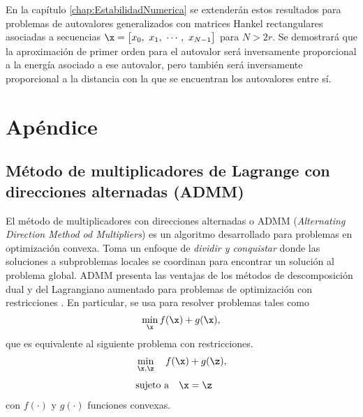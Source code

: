 		En la capítulo \ref{chap:EstabilidadNumerica} se extenderán estos resultados para problemas de autovalores generalizados con matrices Hankel rectangulares asociadas a secuencias $\x = \big[x_0,\ x_1,\ \cdots,\ x_{N-1} \big]$ para $N>2r$. Se demostrará que la aproximación de primer orden para el autovalor será inversamente proporcional a la energía asociado a ese autovalor, pero también será inversamente proporcional a la distancia con la que se encuentran los autovalores entre sí.

	
	
	
	
	
		
	\newpage
	\section{Apéndice}
	
	\subsection{Método de multiplicadores de Lagrange con direcciones alternadas (ADMM)}
	
	El método de multiplicadores con direcciones alternadas o ADMM (\emph{Alternating Direction Method od Multipliers}) \cite{Boyd2011} es un algoritmo desarrollado para problemas en optimización convexa. Toma un enfoque de \emph{dividir y conquistar} donde las soluciones a subproblemas locales se coordinan para encontrar un solución al problema global. ADMM presenta las ventajas de los métodos de descomposición dual y del Lagrangiano aumentado para problemas de optimización con restricciones \cite{Parikh2014}. En particular, se usa para resolver problemas tales como
	\begin{equation}
		\min_{\x} f(\x) + g(\x),
		\label{Eq:ADMM_apx1}
	\end{equation}
	que es equivalente al siguiente problema con restricciones.
	\begin{equation}
		\begin{aligned} 
			& \min_{\x,\z}\quad f(\x) + g(\z), \\[0.3em]
			& \text{sujeto a}\quad \x = \z
		\end{aligned}
		\label{eq:dr1}
	\end{equation}
	con $f(\cdot)$ y $g(\cdot)$ funciones convexas.
	
